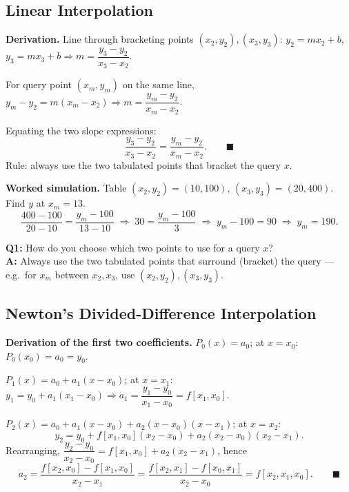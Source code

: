 \subsection{Linear Interpolation}

\begin{examplebox}
\textbf{Derivation.} Line through bracketing points $(x_2,y_2),(x_3,y_3)$: $y_2=mx_2+b$, $y_3=mx_3+b \Rightarrow m=\dfrac{y_3-y_2}{x_3-x_2}$.

For query point $(x_m,y_m)$ on the same line, $y_m-y_2 = m(x_m-x_2) \Rightarrow m = \dfrac{y_m-y_2}{x_m-x_2}$.

Equating the two slope expressions:
\[
\frac{y_3-y_2}{x_3-x_2} = \frac{y_m-y_2}{x_m-x_2}. \qquad\blacksquare
\]
Rule: always use the two tabulated points that bracket the query $x$.
\end{examplebox}

\begin{examplebox}
\textbf{Worked simulation.} Table $(x_2,y_2)=(10,100)$, $(x_3,y_3)=(20,400)$. Find $y$ at $x_m=13$.
\[
\frac{400-100}{20-10} = \frac{y_m-100}{13-10} \;\Longrightarrow\; 30 = \frac{y_m-100}{3} \;\Longrightarrow\; y_m-100=90 \;\Longrightarrow\; y_m=190.
\]
\end{examplebox}

\begin{qabox}
\textbf{Q1:} How do you choose which two points to use for a query $x$? \\
\textbf{A:} Always use the two tabulated points that surround (bracket) the query — e.g.\ for $x_m$ between $x_2,x_3$, use $(x_2,y_2),(x_3,y_3)$.
\end{qabox}

\subsection{Newton's Divided-Difference Interpolation}

\begin{examplebox}
\textbf{Derivation of the first two coefficients.} $P_0(x)=a_0$; at $x=x_0$: $P_0(x_0)=a_0=y_0$.

$P_1(x)=a_0+a_1(x-x_0)$; at $x=x_1$: $y_1=y_0+a_1(x_1-x_0) \Rightarrow a_1=\dfrac{y_1-y_0}{x_1-x_0}=f[x_1,x_0]$.

$P_2(x)=a_0+a_1(x-x_0)+a_2(x-x_0)(x-x_1)$; at $x=x_2$:
\[
y_2 = y_0+f[x_1,x_0](x_2-x_0)+a_2(x_2-x_0)(x_2-x_1).
\]
Rearranging, $\dfrac{y_2-y_0}{x_2-x_0} = f[x_1,x_0]+a_2(x_2-x_1)$, hence
\[
a_2 = \frac{f[x_2,x_0]-f[x_1,x_0]}{x_2-x_1} = \frac{f[x_2,x_1]-f[x_0,x_1]}{x_2-x_0} = f[x_2,x_1,x_0]. \qquad\blacksquare
\]
\end{examplebox}

